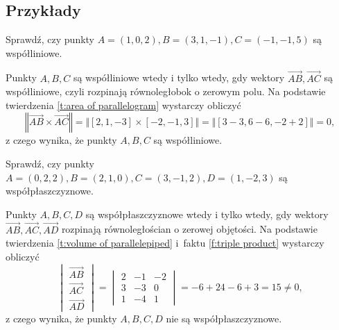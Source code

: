 \subsection{Przykłady}
\begin{example}
    Sprawdź, czy punkty $A = (1, 0, 2), B = (3, 1, -1), C = (-1, -1, 5)$ są współliniowe.
\end{example}
\begin{solution}
    Punkty $A, B, C$ są współliniowe wtedy i tylko wtedy, gdy wektory $\overrightarrow{AB}, \overrightarrow{AC}$ są współliniowe, czyli rozpinają równoległobok o zerowym polu. Na podstawie twierdzenia \ref{t:area of parallelogram} wystarczy obliczyć
    \[ \left\Vert\overrightarrow{AB}\times\overrightarrow{AC}\right\Vert = \Vert[2, 1, -3] \times [-2, -1, 3]\Vert = \Vert[3 - 3, 6 - 6, -2 + 2]\Vert = 0, \]
    z czego wynika, że punkty $A, B, C$ są współliniowe.
\end{solution}

\begin{example}
    Sprawdź, czy punkty $A = (0, 2, 2), B = (2, 1, 0), C = (3, -1, 2), D = (1, -2, 3)$ są współpłaszczyznowe.
\end{example}
\begin{solution}
    Punkty $A, B, C, D$ są współpłaszczyznowe wtedy i tylko wtedy, gdy wektory $\overrightarrow{AB}, \overrightarrow{AC}, \overrightarrow{AD}$ rozpinają równoległościan o zerowej objętości. Na podstawie twierdzenia \ref{t:volume of parallelepiped} i~faktu \ref{f:triple product} wystarczy obliczyć
    \[ \begin{vmatrix}
        \overrightarrow{AB} \\
        \overrightarrow{AC} \\
        \overrightarrow{AD}
    \end{vmatrix} = \begin{vmatrix}
        2 & -1 & -2 \\
        3 & -3 & 0 \\
        1 & -4 & 1
    \end{vmatrix} = -6 + 24 - 6 + 3 = 15 \neq 0, \]
    z czego wynika, że punkty $A, B, C, D$ nie są współpłaszczyznowe.
\end{solution}

